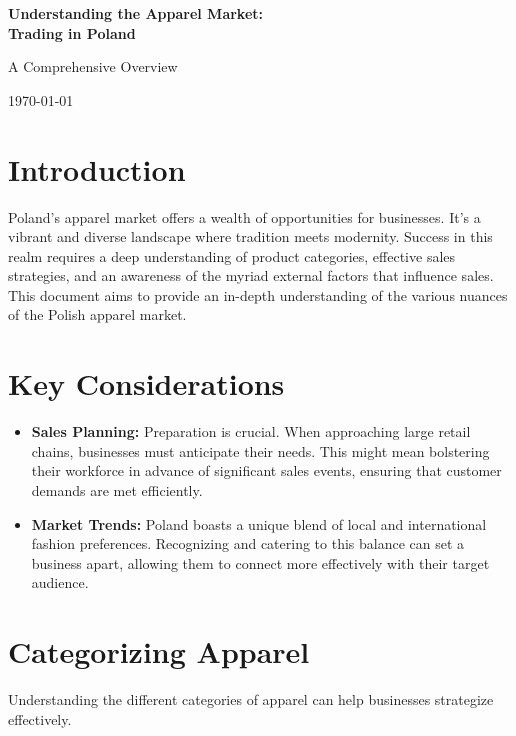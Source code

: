 \documentclass{article}
\begin{document}
\begin{titlepage}
    \centering
    \vspace*{4cm}
    {\Huge\bfseries Understanding the Apparel Market: \\ Trading in Poland \par}
    \vspace{2cm}
    {\large A Comprehensive Overview \par}
    \vfill
    \vspace{2cm}
    {\large \today\par}
\end{titlepage}

\newpage
\tableofcontents
\newpage    

\section{Introduction}
Poland's apparel market offers a wealth of opportunities for businesses. It's a vibrant and diverse landscape where tradition meets modernity. Success in this realm requires a deep understanding of product categories, effective sales strategies, and an awareness of the myriad external factors that influence sales. This document aims to provide an in-depth understanding of the various nuances of the Polish apparel market.

\section{Key Considerations}
\begin{itemize}
    \item \textbf{Sales Planning:} Preparation is crucial. When approaching large retail chains, businesses must anticipate their needs. This might mean bolstering their workforce in advance of significant sales events, ensuring that customer demands are met efficiently.
    \item \textbf{Market Trends:} Poland boasts a unique blend of local and international fashion preferences. Recognizing and catering to this balance can set a business apart, allowing them to connect more effectively with their target audience.
\end{itemize}

\section{Categorizing Apparel}
Understanding the different categories of apparel can help businesses strategize effectively.
\end{document}
